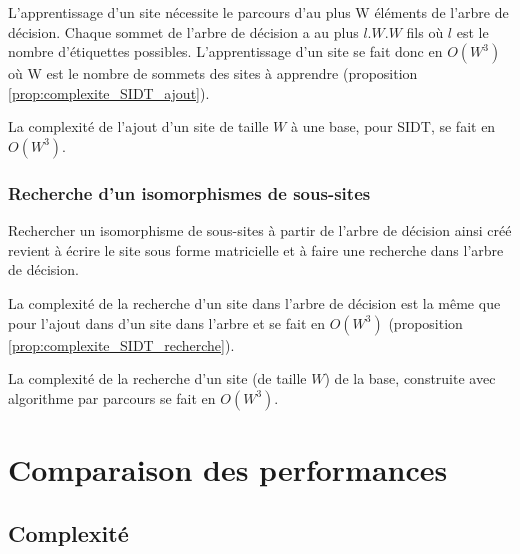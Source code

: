 L'apprentissage d'un site nécessite le parcours d'au plus W éléments de l'arbre de décision. Chaque sommet de l'arbre de décision a au plus $l.W.W$ fils où $l$ est le nombre d'étiquettes possibles. L'apprentissage d'un site se fait donc en $O(W^3)$ où W est le nombre de sommets des sites à apprendre (proposition \ref{prop:complexite_SIDT_ajout}).

\begin{prop}
 La complexité de l'ajout d'un site de taille $W$ à une base, pour SIDT, se fait en $O(W^3)$.
\label{prop:complexite_SIDT_ajout}
\end{prop}

\subsubsection{Recherche d'un isomorphismes de sous-sites}
Rechercher un isomorphisme de sous-sites à partir de l'arbre de décision ainsi créé revient à écrire le site sous forme matricielle et à faire une recherche dans l'arbre de décision.

La complexité de la recherche d'un site dans l'arbre de décision est la même que pour l'ajout dans d'un site dans l'arbre et se fait en $O(W^3)$ (proposition \ref{prop:complexite_SIDT_recherche}). 

\begin{prop}
 La complexité de la recherche d'un site (de taille $W$) de la base, construite avec algorithme par parcours se fait en $O(W^3)$.
\label{prop:complexite_SIDT_recherche}
\end{prop}

\section{Comparaison des performances}
\subsection{Complexité}

